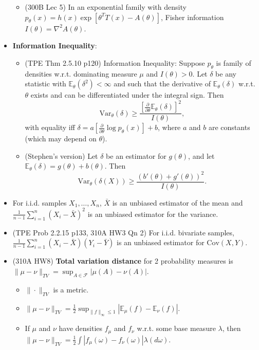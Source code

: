 \documentclass[twoside]{article}
\newcommand{\dis}{\displaystyle}
\newcommand\bbE{\mathbb{E}}
\newcommand\calF{\mathcal{F}}
\newcommand\dlt{\delta}
\newcommand\lmb{\lambda}
\newcommand\om{\omega}
\def\t{\theta}
\begin{document}
\begin{itemize}
\begin{itemize}
\item (300B Lec 5) In an exponential family with density $p_\t(x) = h(x) \exp \left[ \t^T T(x) - A(\t) \right]$, Fisher information $I(\t) = \nabla^2 A(\t)$.
\end{itemize}

\item \textbf{Information Inequality}:
\begin{itemize}
\item (TPE Thm 2.5.10 p120) Information Inequality: Suppose $p_\t$ is family of densities w.r.t. dominating measure $\mu$ and $I(\t) > 0$. Let $\dlt$ be any statistic with $\bbE_\t (\dlt^2) < \infty$ and such that the derivative of $\bbE_\t (\dlt)$ w.r.t. $\t$ exists and can be differentiated under the integral sign. Then
\begin{equation*}
\text{Var}_\t (\dlt) \geq \frac{\left[\frac{\partial}{\partial \t} \bbE_\t (\dlt) \right]^2}{I(\t)},
\end{equation*}
with equality iff $\dlt = a \left[ \displaystyle\frac{\partial}{\partial \t} \log p_\t(x) \right] + b$, where $a$ and $b$ are constants (which may depend on $\t$).

\item (Stephen's version) Let $\dlt$ be an estimator for $g(\t)$, and let $\bbE_\t (\dlt) = g(\t) + b(\t)$. Then
\begin{equation*}
\text{Var}_\t (\dlt(X)) \geq \frac{(b'(\t) + g'(\t))^2}{I(\t)}.
\end{equation*}
\end{itemize}

\item For i.i.d. samples $X_1, \dots, X_n$, $\bar{X}$ is an unbiased estimator of the mean and $\dis\frac{1}{n-1}\sum_{i=1}^n (X_i - \bar{X})^2$ is an unbiased estimator for the variance.

\item (TPE Prob 2.2.15 p133, 310A HW3 Qn 2) For i.i.d. bivariate samples, $\dis\frac{1}{n-1}\sum_{i=1}^n (X_i - \bar{X})(Y_i - \bar{Y})$ is an unbiased estimator for $\text{Cov}(X,Y)$.

\item (310A HW8) \textbf{Total variation distance} for 2 probability measures is $\|\mu - \nu\|_{TV} = \dis\sup_{A \in \calF} |\mu(A) - \nu(A)|$.
\begin{itemize}
\item $\|\cdot\|_{TV}$ is a metric.
\item $\|\mu - \nu\|_{TV} = \dis\frac{1}{2}\sup_{\|f\|_\infty \leq 1} |\bbE_\mu (f) - \bbE_\nu (f)|$.
\item If $\mu$ and $\nu$ have densities $f_\mu$ and $f_\nu$ w.r.t. some base measure $\lmb$, then $\|\mu - \nu\|_{TV} = \dis\frac{1}{2}\int |f_\mu(\om) - f_\nu(\om)| \lmb (d\om)$.
\end{itemize}


\end{itemize}
\end{document}
